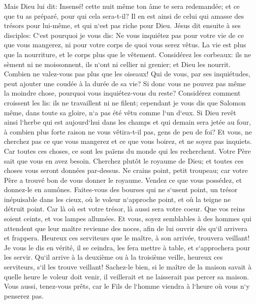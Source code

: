 \verse Mais Dieu lui dit: Insensé! cette nuit même ton âme te sera redemandée; et ce que tu as préparé, pour qui cela sera-t-il? 
\verse Il en est ainsi de celui qui amasse des trésors pour lui-même, et qui n`est pas riche pour Dieu. 
\verse Jésus dit ensuite à ses disciples: C`est pourquoi je vous dis: Ne vous inquiétez pas pour votre vie de ce que vous mangerez, ni pour votre corps de quoi vous serez vêtus. 
\verse La vie est plus que la nourriture, et le corps plus que le vêtement. 
\verse Considérez les corbeaux: ils ne sèment ni ne moissonnent, ils n`ont ni cellier ni grenier; et Dieu les nourrit. Combien ne valez-vous pas plus que les oiseaux! 
\verse Qui de vous, par ses inquiétudes, peut ajouter une coudée à la durée de sa vie? 
\verse Si donc vous ne pouvez pas même la moindre chose, pourquoi vous inquiétez-vous du reste? 
\verse Considérez comment croissent les lis: ils ne travaillent ni ne filent; cependant je vous dis que Salomon même, dans toute sa gloire, n`a pas été vêtu comme l`un d`eux. 
\verse Si Dieu revêt ainsi l`herbe qui est aujourd`hui dans les champs et qui demain sera jetée au four, à combien plus forte raison ne vous vêtira-t-il pas, gens de peu de foi? 
\verse Et vous, ne cherchez pas ce que vous mangerez et ce que vous boirez, et ne soyez pas inquiets. 
\verse Car toutes ces choses, ce sont les païens du monde qui les recherchent. Votre Père sait que vous en avez besoin. 
\verse Cherchez plutôt le royaume de Dieu; et toutes ces choses vous seront données par-dessus. 
\verse Ne crains point, petit troupeau; car votre Père a trouvé bon de vous donner le royaume. 
\verse Vendez ce que vous possédez, et donnez-le en aumônes. Faites-vous des bourses qui ne s`usent point, un trésor inépuisable dans les cieux, où le voleur n`approche point, et où la teigne ne détruit point. 
\verse Car là où est votre trésor, là aussi sera votre coeur. 
\verse Que vos reins soient ceints, et vos lampes allumées. 
\verse Et vous, soyez semblables à des hommes qui attendent que leur maître revienne des noces, afin de lui ouvrir dès qu`il arrivera et frappera. 
\verse Heureux ces serviteurs que le maître, à son arrivée, trouvera veillant! Je vous le dis en vérité, il se ceindra, les fera mettre à table, et s`approchera pour les servir. 
\verse Qu`il arrive à la deuxième ou à la troisième veille, heureux ces serviteurs, s`il les trouve veillant! 
\verse Sachez-le bien, si le maître de la maison savait à quelle heure le voleur doit venir, il veillerait et ne laisserait pas percer sa maison. 
\verse Vous aussi, tenez-vous prêts, car le Fils de l`homme viendra à l`heure où vous n`y penserez pas. 
